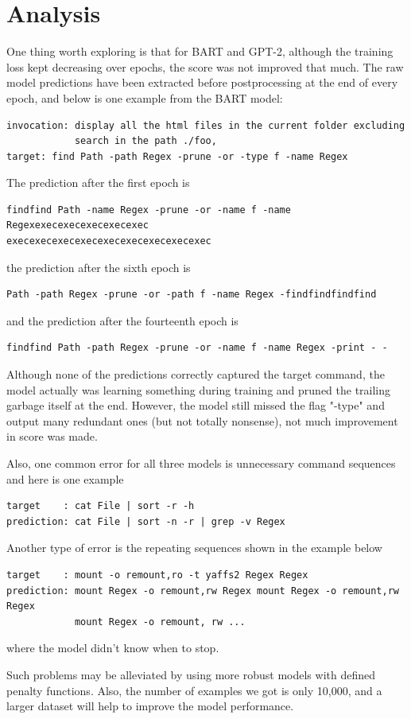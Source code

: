 \documentclass{article}
\begin{document}
\section{Analysis}
One thing worth exploring is that for BART and GPT-2, although the training loss kept decreasing over epochs, the score was not improved that much. The raw model predictions have been extracted before postprocessing at the end of every epoch, and below is one example from the BART model:
\begin{verbatim}
invocation: display all the html files in the current folder excluding 
            search in the path ./foo,
target: find Path -path Regex -prune -or -type f -name Regex
\end{verbatim}
The prediction after the first epoch is
\begin{verbatim}
findfind Path -name Regex -prune -or -name f -name Regexexecexecexecexecexec
execexecexecexecexecexecexecexecexec
\end{verbatim}
the prediction after the sixth epoch is
\begin{verbatim}
Path -path Regex -prune -or -path f -name Regex -findfindfindfind
\end{verbatim}
and the prediction after the fourteenth epoch is
\begin{verbatim}
findfind Path -path Regex -prune -or -name f -name Regex -print - -
\end{verbatim}
Although none of the predictions correctly captured the target command, the model actually was learning something during training and pruned the trailing garbage itself at the end. However, the model still missed the flag "-type" and output many redundant ones (but not totally nonsense), not much improvement in score was made.

Also, one common error for all three models is unnecessary command sequences and here is one example
\begin{verbatim}
target    : cat File | sort -r -h 
prediction: cat File | sort -n -r | grep -v Regex
\end{verbatim}
Another type of error is the repeating sequences shown in the example below
\begin{verbatim}
target    : mount -o remount,ro -t yaffs2 Regex Regex 
prediction: mount Regex -o remount,rw Regex mount Regex -o remount,rw Regex 
            mount Regex -o remount, rw ...
\end{verbatim}
where the model didn't know when to stop. 

Such problems may be alleviated by using more robust models with defined penalty functions. Also, the number of examples we got is only 10,000, and a larger dataset will help to improve the model performance. 
\end{document}
